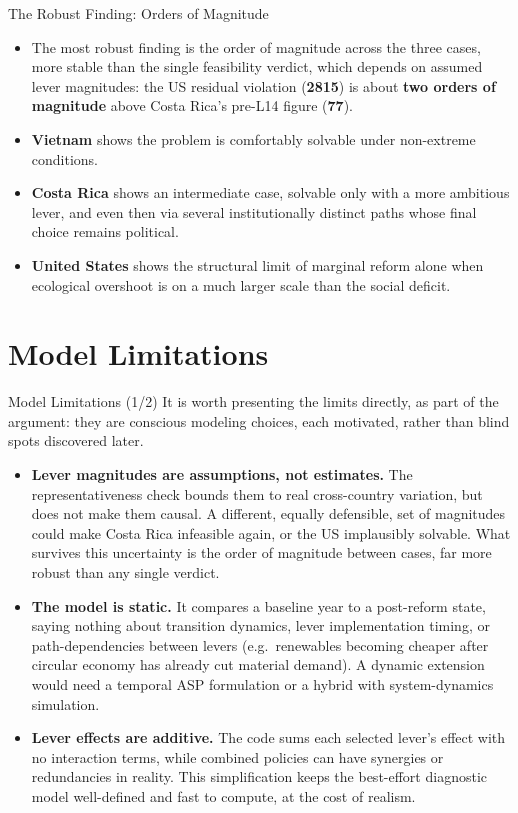 \documentclass[11pt,aspectratio=169]{beamer}
\begin{document}
\begin{frame}{The Robust Finding: Orders of Magnitude}
  \begin{itemize}
    \item The most robust finding is the \alert{order of magnitude} across the three cases, more stable than the single feasibility verdict, which depends on assumed lever magnitudes: the US residual violation (\textbf{2815}) is about \textbf{two orders of magnitude} above Costa Rica's pre-L14 figure (\textbf{77}).
    \item \textbf{Vietnam} shows the problem is comfortably solvable under non-extreme conditions.
    \item \textbf{Costa Rica} shows an intermediate case, solvable only with a more ambitious lever, and even then via several institutionally distinct paths whose final choice remains political.
    \item \textbf{United States} shows the structural limit of marginal reform alone when ecological overshoot is on a much larger scale than the social deficit.
  \end{itemize}
\end{frame}

\section[Limitations]{Model Limitations}

\begin{frame}{Model Limitations (1/2)}
  \footnotesize
  It is worth presenting the limits directly, as part of the argument: they are conscious modeling choices, each motivated, rather than blind spots discovered later.
  \begin{itemize}
    \item \textbf{Lever magnitudes are assumptions, not estimates.} The representativeness check bounds them to real cross-country variation, but does not make them causal. A different, equally defensible, set of magnitudes could make Costa Rica infeasible again, or the US implausibly solvable. What survives this uncertainty is the \alert{order of magnitude} between cases, far more robust than any single verdict.
    \item \textbf{The model is static.} It compares a baseline year to a post-reform state, saying nothing about transition dynamics, lever implementation timing, or path-dependencies between levers (e.g.\ renewables becoming cheaper after circular economy has already cut material demand). A dynamic extension would need a temporal ASP formulation or a hybrid with system-dynamics simulation.
    \item \textbf{Lever effects are additive.} The code sums each selected lever's effect with no interaction terms, while combined policies can have synergies or redundancies in reality. This simplification keeps the best-effort diagnostic model well-defined and fast to compute, at the cost of realism.
  \end{itemize}
\end{frame}
\end{document}
